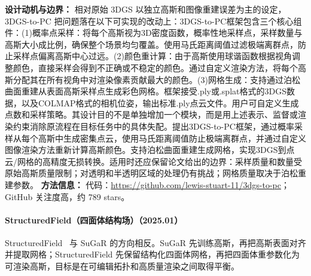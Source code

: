 \textbf{设计动机与边界：} 相对原始 3DGS 以独立高斯和图像重建误差为主的设定，3DGS-to-PC 把问题落在以下可实现的改动上：3DGS-to-PC框架包含三个核心组件：(1)概率点采样：将每个高斯视为3D密度函数，概率性地采样点，采样数量与高斯大小成比例，确保整个场景均匀覆盖。使用马氏距离阈值过滤极端离群点，防止采样点偏离高斯中心过远。(2)颜色重计算：由于高斯使用球谐函数根据视角调整颜色，直接采样会得到不正确或不稳定的颜色。通过自定义渲染方法，将每个高斯分配其在所有视角中对渲染像素贡献最大的颜色。(3)网格生成：支持通过泊松曲面重建从表面高斯采样点生成彩色网格。框架接受.ply或.splat格式的3DGS数据，以及COLMAP格式的相机位姿，输出标准.ply点云文件。用户可自定义生成点数和采样策略。其设计目的不是单独增加一个模块，而是用上述表示、监督或渲染约束消除原流程在目标任务中的具体失配。提出3DGS-to-PC框架，通过概率采样从每个高斯中生成密集点云，使用马氏距离阈值防止极端离群点，并通过自定义图像渲染方法重新计算高斯颜色。支持泊松曲面重建生成网格，实现3DGS到点云/网格的高精度无损转换。适用时还应保留论文给出的边界：采样质量和数量受原始高斯质量限制；对透明和半透明区域的处理仍有挑战；网格质量取决于泊松重建参数。
\textbf{方法信息：} 代码：\url{https://github.com/lewis-stuart-11/3dgs-to-pc}；GitHub 关注度高，约 789 stars。



\paragraph{StructuredField（四面体结构场）（2025.01）}
StructuredField~\cite{2501_18152} 与 SuGaR 的方向相反。SuGaR 先训练高斯，再把高斯表面对齐并提取网格；StructuredField 先保留结构化四面体网格，再把四面体重参数化为可渲染高斯，目标是在可编辑拓扑和高质量渲染之间取得平衡。

